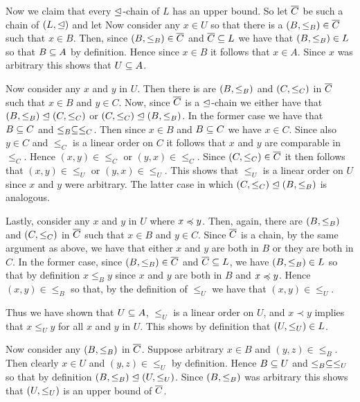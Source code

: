 {{      Now we claim that every $\tleq$-chain of $L$ has an upper bound.
      So let $\Cb$ be such a chain of $(L, \tleq)$ and let
      Now consider any $x \in U$ so that there is a $\lord{B} \in \Cb$ such that $x \in B$.
      Then, since $\lord{B} \in \Cb$ and $\Cb \ss L$ we have that $\lord{B} \in L$ so that $B \ss A$ by definition.
      Hence since $x \in B$ it follows that $x \in A$.
      Since $x$ was arbitrary this shows that $U \ss A$.

      Now consider any $x$ and $y$ in $U$.
      Then there is are $\lord{B}$ and $\lord{C}$ in $\Cb$ such that $x \in B$ and $y \in C$.
      Now, since $\Cb$ is a $\tleq$-chain we either have that $\lord{B} \tleq \lord{C}$ or $\lord{C} \tleq \lord{B}$.
      In the former case we have that $B \ss C$ and $\leq_B \ss \leq_C$.
      Then since $x \in B$ and $B \ss C$ we have $x \in C$.
      Since also $y \in C$ and $\leq_C$ is a linear order on $C$ it follows that $x$ and $y$ are comparable in $\leq_C$.
      Hence $(x,y) \in \leq_C$ or $(y,x) \in \leq_C$.
      Since $\lord{C} \in \Cb$ it then follows that $(x,y) \in \leq_U$ or $(y,x) \in \leq_U$.
      This shows that $\leq_U$ is a linear order on $U$ since $x$ and $y$ were arbitrary.
      The latter case in which $\lord{C} \tleq \lord{B}$ is analogous.

      Lastly, consider any $x$ and $y$ in $U$ where $x \prece y$.
      Then, again, there are $\lord{B}$ and $\lord{C}$ in $\Cb$ such that $x \in B$ and $y \in C$.
      Since $\Cb$ is a chain, by the same argument as above, we have that either $x$ and $y$ are both in $B$ or they are both in $C$.
      In the former case, since $\lord{B} \in \Cb$ and $\Cb \ss L$, we have $\lord{B} \in L$ so that by definition $x \leq_B y$ since $x$ and $y$ are both in $B$ and $x \prece y$.
      Hence $(x,y) \in \leq_B$ so that, by the definition of $\leq_U$ we have that $(x,y) \in \leq_U$.

      Thus we have shown that $U \ss A$, $\leq_U$ is a linear order on $U$, and $x \prec y$ implies that $x \leq_U y$ for all $x$ and $y$ in $U$.
      This shows by definition that $\lord{U} \in L$.

      Now consider any $\lord{B}$ in $\Cb$.
      Suppose arbitrary $x \in B$ and $(y,z) \in \leq_B$.
      Then clearly $x \in U$ and $(y,z) \in \leq_U$ by definition.
      Hence $B \ss U$ and $\leq_B \ss \leq_U$ so that by definition $\lord{B} \tleq \lord{U}$.
      Since $\lord{B}$ was arbitrary this shows that $\lord{U}$ is an upper bound of $\Cb$.

}}
